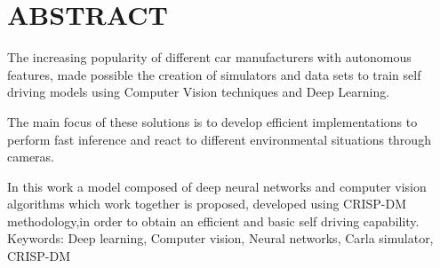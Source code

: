 \newpage
\section*{\hspace{6.4cm}ABSTRACT}
The increasing popularity of different car manufacturers with autonomous features, made possible the creation of simulators and data sets to train self driving models using Computer Vision techniques and Deep Learning.

The main focus of these solutions is to develop efficient implementations to perform fast inference and react to different environmental situations through cameras.

In this work a model composed of deep neural networks and computer vision algorithms which work together is proposed, developed using CRISP-DM methodology,in order to obtain an efficient and basic self driving capability.\\

\noindent Keywords: Deep learning, Computer vision, Neural networks, Carla simulator, CRISP-DM